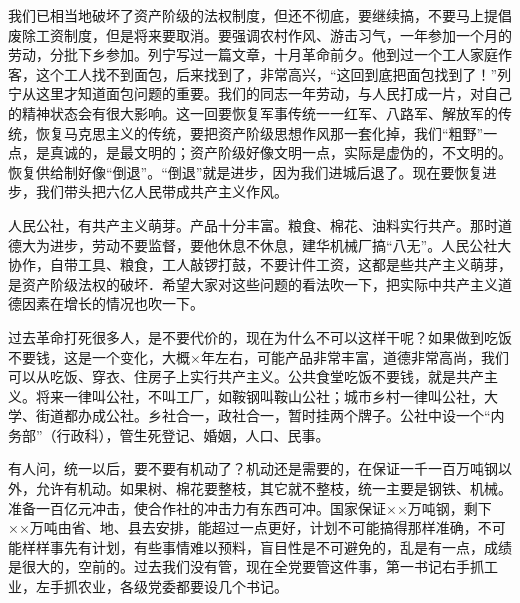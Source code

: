 我们已相当地破坏了资产阶级的法权制度，但还不彻底，要继续搞，不要马上提倡废除工资制度，但是将来要取消。要强调农村作风、游击习气，一年参加一个月的劳动，分批下乡参加。列宁写过一篇文章，十月革命前夕。他到过一个工人家庭作客，这个工人找不到面包，后来找到了，非常高兴，“这回到底把面包找到了！”列宁从这里才知道面包问题的重要。我们的同志一年劳动，与人民打成一片，对自己的精神状态会有很大影响。这一回要恢复军事传统一一红军、八路军、解放军的传统，恢复马克思主义的传统，要把资产阶级思想作风那一套化掉，我们“粗野”一点，是真诚的，是最文明的；资产阶级好像文明一点，实际是虚伪的，不文明的。恢复供给制好像“倒退”。“倒退”就是进步，因为我们进城后退了。现在要恢复进步，我们带头把六亿人民带成共产主义作风。

人民公社，有共产主义萌芽。产品十分丰富。粮食、棉花、油料实行共产。那时道德大为进步，劳动不要监督，要他休息不休息，建华机械厂搞“八无”。人民公社大协作，自带工具、粮食，工人敲锣打鼓，不要计件工资，这都是些共产主义萌芽，是资产阶级法权的破坏．希望大家对这些问题的看法吹一下，把实际中共产主义道德因素在增长的情况也吹一下。

过去革命打死很多人，是不要代价的，现在为什么不可以这样干呢？如果做到吃饭不要钱，这是一个变化，大概×年左右，可能产品非常丰富，道德非常高尚，我们可以从吃饭、穿衣、住房子上实行共产主义。公共食堂吃饭不要钱，就是共产主义。将来一律叫公社，不叫工厂，如鞍钢叫鞍山公社；城市乡村一律叫公社，大学、街道都办成公社。乡社合一，政社合一，暂时挂两个牌子。公社中设一个“内务部”（行政科），管生死登记、婚姻，人口、民事。

有人问，统一以后，要不要有机动了？机动还是需要的，在保证一千一百万吨钢以外，允许有机动。如果树、棉花要整枝，其它就不整枝，统一主要是钢铁、机械。准备一百亿元冲击，使合作社的冲击力有东西可冲。国家保证××万吨钢，剩下××万吨由省、地、县去安排，能超过一点更好，计划不可能搞得那样准确，不可能样样事先有计划，有些事情难以预料，盲目性是不可避免的，乱是有一点，成绩是很大的，空前的。过去我们没有管，现在全党要管这件事，第一书记右手抓工业，左手抓农业，各级党委都要设几个书记。


